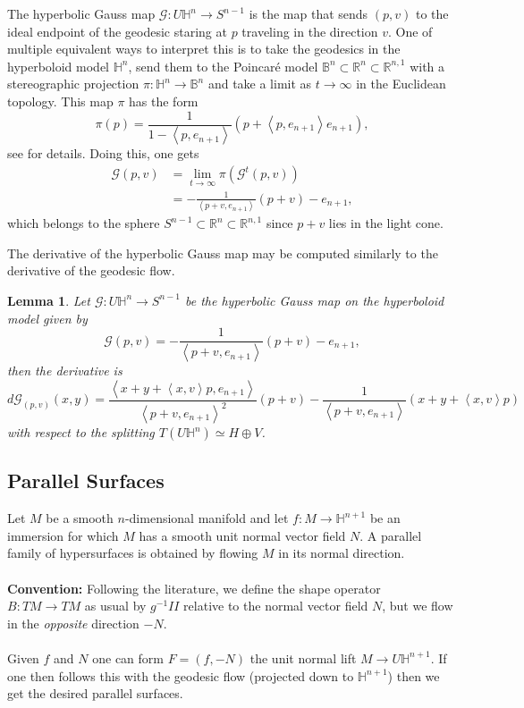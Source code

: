 \documentclass{amsart}
\newcommand{\R}{\mathbb{R}}
\newcommand{\two}{I\!\!I}
\newtheorem{lem}[thm]{Lemma}
\renewcommand{\H}{\mathbb{H}}
\begin{document}
The hyperbolic Gauss map $\mathcal{G}:U\H^n \to S^{n-1}$ is the map that sends $(p,v)$ to the ideal endpoint of the geodesic staring at $p$ traveling in the direction $v$. 
One of multiple equivalent ways to interpret this is to take the geodesics in the hyperboloid model $\H^n$, send them to the Poincar\'e model $\mathbb{B}^n \subset \R^n \subset \R^{n,1}$ with a stereographic projection $\pi: \H^n \to \mathbb{B}^n$ and take a limit as $t\to \infty$ in the Euclidean topology. 
This map $\pi$ has the form
\[
\pi(p) = \frac{1}{1 - \left< p, e_{n+1} \right>}(p + \left<p,e_{n+1}\right> e_{n+1}),
\]
see \cite{Lee2018} for details. 
Doing this, one gets 
\begin{align*}
\mathcal{G}(p,v) 
&= \lim_{t \to \infty} \pi(\mathcal{G}^t(p,v)) \\
&= -\frac{1}{\left<p+v,e_{n+1}\right>} (p+v) - e_{n+1},
\end{align*} 
which belongs to the sphere $S^{n-1} \subset \R^n \subset \R^{n,1}$ since $p+v$ lies in the light cone. 

The derivative of the hyperbolic Gauss map may be computed similarly to the derivative of the geodesic flow. 

\begin{lem}
Let $\mathcal{G}:U\H^n \to S^{n-1}$ be the hyperbolic Gauss map on the hyperboloid model given by 
\[
\mathcal{G}(p,v) = -\frac{1}{\left<p+v,e_{n+1}\right>}(p+v) - e_{n+1},
\]
then the derivative is 
\[
d\mathcal{G}_{(p,v)}(x,y)
=\frac{\left< x + y + \left<x,v\right>p, e_{n+1} \right>}{\left< p + v, e_{n+1} \right>^2}(p+v) - \frac{1}{\left< p + v, e_{n+1} \right>}(x + y + \left<x,v\right>p)
\]
with respect to the splitting $T(U\H^n) \simeq H \oplus V$.
\end{lem}

\subsection{Parallel Surfaces}

Let $M$ be a smooth $n$-dimensional manifold and let $f: M \to \H^{n+1}$ be an immersion for which $M$ has a smooth unit normal vector field $N$.
A parallel family of hypersurfaces is obtained by flowing $M$ in its normal direction. 
\\
\\
\noindent
{\bf Convention:} Following the literature, we define the shape operator $B: TM \to TM$ as usual by $g^{-1}\two$ relative to the normal vector field $N$, but we flow in the \emph{opposite} direction $-N$. 
\\
\\
Given $f$ and $N$ one can form $F = (f ,-N)$ the unit normal lift $M \to U\H^{n+1}$.
If one then follows this with the geodesic flow (projected down to $\H^{n+1}$) then we get the desired parallel surfaces.
\end{document}
